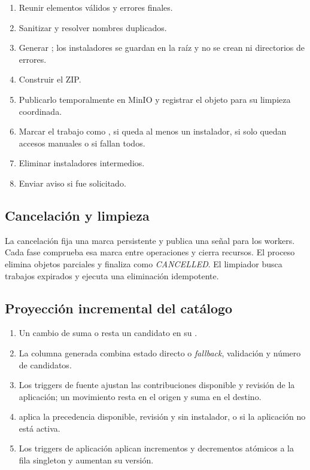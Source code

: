 \begin{enumerate}
	\item Reunir elementos válidos y errores finales.
	\item Sanitizar y resolver nombres duplicados.
	\item Generar ; los instaladores se guardan en la raíz y no se crean  ni directorios de errores.
	\item Construir el ZIP.
	\item Publicarlo temporalmente en MinIO y registrar el objeto para su limpieza coordinada.
	\item Marcar el trabajo como ,  si queda al menos un instalador,  si solo quedan accesos manuales o  si fallan todos.
	\item Eliminar instaladores intermedios.
	\item Enviar aviso si fue solicitado.
\end{enumerate}

\subsection{Cancelación y limpieza}

La cancelación fija una marca persistente y publica una señal para los workers. Cada fase comprueba esa marca entre operaciones y cierra recursos. El proceso elimina objetos parciales y finaliza como \emph{CANCELLED}. El limpiador busca trabajos expirados y ejecuta una eliminación idempotente.

\subsection{Proyección incremental del catálogo}

\begin{enumerate}
	\item Un cambio de  suma o resta un candidato en su .
	\item La columna generada  combina estado directo o \emph{fallback}, validación y número de candidatos.
	\item Los triggers de fuente ajustan las contribuciones disponible y revisión de la aplicación; un movimiento resta en el origen y suma en el destino.
	\item {} aplica la precedencia disponible, revisión y sin instalador, o  si la aplicación no está activa.
	\item Los triggers de aplicación aplican incrementos y decrementos atómicos a la fila singleton y aumentan su versión.
\end{enumerate}

